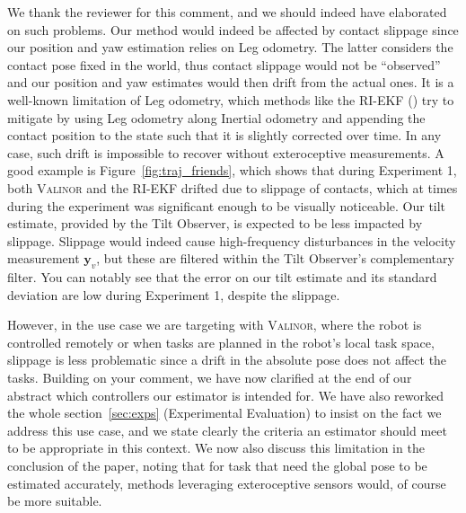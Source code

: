 We thank the reviewer for this comment, and we should indeed have elaborated on such problems. Our method would indeed be affected by contact slippage since our position and yaw estimation relies on Leg odometry. The latter considers the contact pose fixed in the world, thus contact slippage would not be ``observed'' and our position and yaw estimates would then drift from the actual ones. It is a well-known limitation of Leg odometry, which methods like the RI-EKF (\cite{Hartley2020RIEKF}) try to mitigate by using Leg odometry along Inertial odometry and appending the contact position to the state such that it is slightly corrected over time. In any case, such drift is impossible to recover without exteroceptive measurements. A good example is Figure~\ref{fig:traj_friends}, which shows that during Experiment 1, both {\scshape Valinor} and the RI-EKF drifted due to slippage of contacts, which at times during the experiment was significant enough to be visually noticeable.
Our tilt estimate, provided by the Tilt Observer, is expected to be less impacted by slippage. Slippage would indeed cause high-frequency disturbances in the velocity measurement $\boldsymbol{y}_v$, but these are filtered within the Tilt Observer's complementary filter. You can notably see that the error on our tilt estimate and its standard deviation are low during Experiment 1, despite the slippage.

However, in the use case we are targeting with {\scshape Valinor}, where the robot is controlled remotely or when tasks are planned in the robot's local task space, slippage is less problematic since a drift in the absolute pose does not affect the tasks. Building on your comment, we have now clarified at the end of our abstract which controllers our estimator is intended for. We have also reworked the whole section~\ref{sec:exps} (Experimental Evaluation) to insist on the fact we address this use case, and we state clearly the criteria an estimator should meet to be appropriate in this context. We now also discuss this limitation in the conclusion of the paper, noting that for task that need the global pose to be estimated accurately, methods leveraging exteroceptive sensors would, of course be more suitable. 

